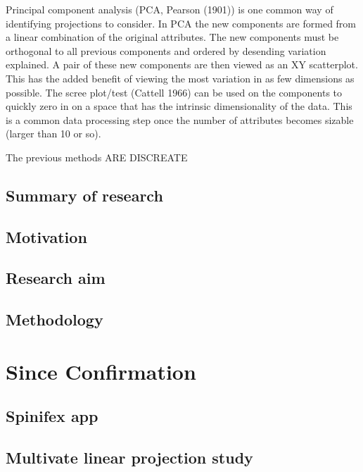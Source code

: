 \documentclass[11,]{article}
\begin{document}
Principal component analysis (PCA, Pearson (1901)) is one common way of identifying projections to consider. In PCA the new components are formed from a linear combination of the original attributes. The new components must be orthogonal to all previous components and ordered by desending variation explained. A pair of these new components are then viewed as an XY scatterplot. This has the added benefit of viewing the most variation in as few dimensions as possible. The scree plot/test (Cattell 1966) can be used on the components to quickly zero in on a space that has the intrinsic dimensionality of the data. This is a common data processing step once the number of attributes becomes sizable (larger than 10 or so).

The previous methods ARE DISCREATE

\hypertarget{summary-of-research}{%
\subsection{Summary of research}\label{summary-of-research}}

\hypertarget{motivation}{%
\subsection{Motivation}\label{motivation}}

\hypertarget{research-aim}{%
\subsection{Research aim}\label{research-aim}}

\hypertarget{methodology}{%
\subsection{Methodology}\label{methodology}}

\hypertarget{since-confirmation}{%
\section{Since Confirmation}\label{since-confirmation}}

\hypertarget{spinifex-app}{%
\subsection{Spinifex app}\label{spinifex-app}}

\hypertarget{multivate-linear-projection-study}{%
\subsection{Multivate linear projection study}\label{multivate-linear-projection-study}}
\end{document}
